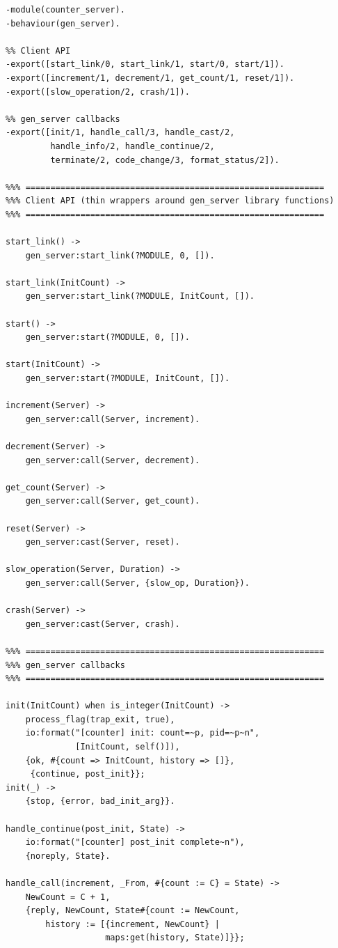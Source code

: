 \documentclass[a4paper,11pt]{article}
\begin{document}
\begin{lstlisting}[style=erlangstyle, caption={counter\_server.erl --- 贯穿全文的回调模块}]
-module(counter_server).
-behaviour(gen_server).

%% Client API
-export([start_link/0, start_link/1, start/0, start/1]).
-export([increment/1, decrement/1, get_count/1, reset/1]).
-export([slow_operation/2, crash/1]).

%% gen_server callbacks
-export([init/1, handle_call/3, handle_cast/2,
         handle_info/2, handle_continue/2,
         terminate/2, code_change/3, format_status/2]).

%%% ============================================================
%%% Client API (thin wrappers around gen_server library functions)
%%% ============================================================

start_link() ->
    gen_server:start_link(?MODULE, 0, []).

start_link(InitCount) ->
    gen_server:start_link(?MODULE, InitCount, []).

start() ->
    gen_server:start(?MODULE, 0, []).

start(InitCount) ->
    gen_server:start(?MODULE, InitCount, []).

increment(Server) ->
    gen_server:call(Server, increment).

decrement(Server) ->
    gen_server:call(Server, decrement).

get_count(Server) ->
    gen_server:call(Server, get_count).

reset(Server) ->
    gen_server:cast(Server, reset).

slow_operation(Server, Duration) ->
    gen_server:call(Server, {slow_op, Duration}).

crash(Server) ->
    gen_server:cast(Server, crash).

%%% ============================================================
%%% gen_server callbacks
%%% ============================================================

init(InitCount) when is_integer(InitCount) ->
    process_flag(trap_exit, true),
    io:format("[counter] init: count=~p, pid=~p~n",
              [InitCount, self()]),
    {ok, #{count => InitCount, history => []},
     {continue, post_init}};
init(_) ->
    {stop, {error, bad_init_arg}}.

handle_continue(post_init, State) ->
    io:format("[counter] post_init complete~n"),
    {noreply, State}.

handle_call(increment, _From, #{count := C} = State) ->
    NewCount = C + 1,
    {reply, NewCount, State#{count := NewCount,
        history := [{increment, NewCount} |
                    maps:get(history, State)]}};


\end{lstlisting}
\end{document}
